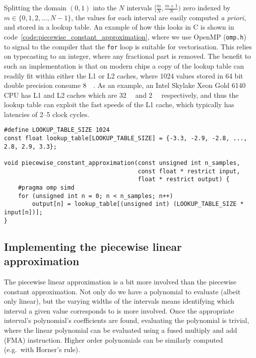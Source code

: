 \documentclass[9pt,a4paper,english]{extarticle}
\begin{document}
Splitting the domain $ (0, 1) $ into the $ N $ intervals $ [\tfrac{m}{N}, \tfrac{m+1}{N}) $ zero indexed by $ m \in \{0,1,2,\ldots,N-1\}$, the values for each interval are easily computed \textit{a priori}, and stored in a lookup table. An example of how this looks in C is shown in code~\ref{code:piecewise_constant_approximation}, where we use OpenMP (\texttt{omp.h}) to signal to the compiler that the \texttt{for} loop is suitable for vectorisation. This relies on typecasting to an integer, where any fractional part is removed. The benefit to such an implementation is that on modern chips a copy of the lookup table can readily fit within either the L1 or L2 caches, where 1024 values stored in 64 bit double precision consume \SI{8}{\kilo\byte}. As an example, an Intel Skylake Xeon Gold 6140 CPU has L1 and L2 caches which are \SI{32}{\kilo\byte} and \SI{2}{\mega\byte} respectively, and thus the lookup table can exploit the fast speeds of the L1 cache, which typically has latencies of 2--5 clock cycles. 

\begin{lstfloat}[htb]
\begin{lstlisting}[style=C, caption={C implementation of the piecewise constant approximation.}, label={code:piecewise_constant_approximation}]
#define LOOKUP_TABLE_SIZE 1024
const float lookup_table[LOOKUP_TABLE_SIZE] = {-3.3, -2.9, -2.8, ..., 2.8, 2.9, 3.3};

void piecewise_constant_approximation(const unsigned int n_samples, 
                                      const float * restrict input, 
                                      float * restrict output) {
    #pragma omp simd
    for (unsigned int n = 0; n < n_samples; n++) 
        output[n] = lookup_table[(unsigned int) (LOOKUP_TABLE_SIZE * input[n])];
}
\end{lstlisting}
\end{lstfloat}

\subsection{Implementing the piecewise linear approximation}

The piecewise linear approximation is a bit more involved than the piecewise constant approximation. Not only do we have a polynomial to evaluate (albeit only linear), but the varying widths of the intervals means identifying which interval a given value corresponds to is more involved. Once the appropriate interval's polynomial's coefficients are found, evaluating the polynomial is trivial, where the linear polynomial can be evaluated using a fused multiply and add (FMA) instruction. Higher order polynomials can be similarly computed (e.g.\ with Horner's rule). 
\end{document}
